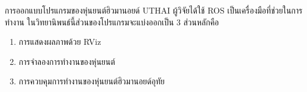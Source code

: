 การออกแบบโปรแกรมของหุ่นยนต์ฮิวมานอยด์ UTHAI ผู้วิจัยได้ใช้ ROS เป็นเครื่องมือที่ช่วยในการทำงาน
ในวิทยานิพนธ์นี้ส่วนของโปรแกรมจะแบ่งออกเป็น 3 ส่วนหลักคือ
\vspace{-3mm}
\begin{enumerate}[label=\arabic*, leftmargin=1.5cm]
	\setlength\itemsep{-0.25em}
	\item การแสดงผลภาพด้วย RViz
    \item การจำลองการทำงานของหุ่นยนต์
    \item การควบคุมการทำงานของหุ่นยนต์ฮิวมานอยด์อุทัย
\end{enumerate}

